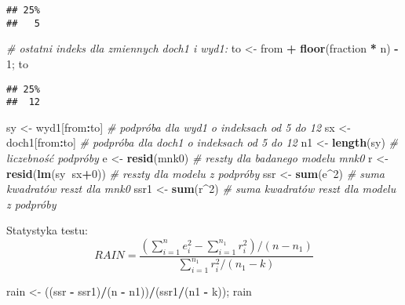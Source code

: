 \documentclass[polish,]{book}
\newenvironment{Shaded}{\begin{snugshade}}{\end{snugshade}}
\newcommand{\CommentTok}[1]{\textcolor[rgb]{0.56,0.35,0.01}{\textit{#1}}}
\newcommand{\DecValTok}[1]{\textcolor[rgb]{0.00,0.00,0.81}{#1}}
\newcommand{\KeywordTok}[1]{\textcolor[rgb]{0.13,0.29,0.53}{\textbf{#1}}}
\newcommand{\NormalTok}[1]{#1}
\newcommand{\OperatorTok}[1]{\textcolor[rgb]{0.81,0.36,0.00}{\textbf{#1}}}
\newcommand{\StringTok}[1]{\textcolor[rgb]{0.31,0.60,0.02}{#1}}
\begin{document}
\begin{verbatim}
## 25% 
##   5
\end{verbatim}

\begin{Shaded}
\begin{Highlighting}[]
\CommentTok{# ostatni indeks dla zmiennych doch1 i wyd1:}
\NormalTok{to <-}\StringTok{ }\NormalTok{from }\OperatorTok{+}\StringTok{ }\KeywordTok{floor}\NormalTok{(fraction }\OperatorTok{*}\StringTok{ }\NormalTok{n) }\OperatorTok{-}\StringTok{ }\DecValTok{1}\NormalTok{; to}
\end{Highlighting}
\end{Shaded}

\begin{verbatim}
## 25% 
##  12
\end{verbatim}

\begin{Shaded}
\begin{Highlighting}[]
\NormalTok{sy <-}\StringTok{ }\NormalTok{wyd1[from}\OperatorTok{:}\NormalTok{to]    }\CommentTok{# podpróba dla wyd1 o indeksach od 5 do 12}
\NormalTok{sx <-}\StringTok{ }\NormalTok{doch1[from}\OperatorTok{:}\NormalTok{to]   }\CommentTok{# podpróba dla doch1 o indeksach od 5 do 12}
\NormalTok{n1 <-}\StringTok{ }\KeywordTok{length}\NormalTok{(sy)     }\CommentTok{# liczebność podpróby}
\NormalTok{e <-}\StringTok{ }\KeywordTok{resid}\NormalTok{(mnk0)     }\CommentTok{# reszty dla badanego modelu mnk0}
\NormalTok{r <-}\StringTok{ }\KeywordTok{resid}\NormalTok{(}\KeywordTok{lm}\NormalTok{(sy}\OperatorTok{~}\NormalTok{sx}\OperatorTok{+}\DecValTok{0}\NormalTok{)) }\CommentTok{# reszty dla modelu z podpróby}
\NormalTok{ssr <-}\StringTok{ }\KeywordTok{sum}\NormalTok{(e}\OperatorTok{^}\DecValTok{2}\NormalTok{)      }\CommentTok{# suma kwadratów reszt dla mnk0}
\NormalTok{ssr1 <-}\StringTok{ }\KeywordTok{sum}\NormalTok{(r}\OperatorTok{^}\DecValTok{2}\NormalTok{)     }\CommentTok{# suma kwadratów reszt dla modelu z podpróby}
\end{Highlighting}
\end{Shaded}

Statystyka testu:
\begin{equation}
RAIN=\frac{(\sum_{i=1}^{n}e_i^2-\sum_{i=1}^{n_1}r_i^2)/(n-n_1)}{\sum_{i=1}^{n_1}r_i^2/(n_1-k)}
\label{eq:wz139}
\end{equation}

\begin{Shaded}
\begin{Highlighting}[]
\NormalTok{rain <-}\StringTok{ }\NormalTok{((ssr }\OperatorTok{-}\StringTok{ }\NormalTok{ssr1)}\OperatorTok{/}\NormalTok{(n }\OperatorTok{-}\StringTok{ }\NormalTok{n1))}\OperatorTok{/}\NormalTok{(ssr1}\OperatorTok{/}\NormalTok{(n1 }\OperatorTok{-}\StringTok{ }\NormalTok{k)); rain}
\end{Highlighting}
\end{Shaded}
\end{document}
